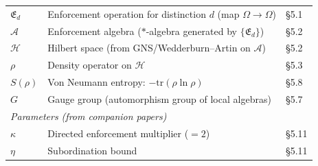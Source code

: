 \documentclass[11pt]{article}
\begin{document}
\begin{center}
\begin{tabular}{lp{8.5cm}l}
$\mathfrak{E}_d$ & Enforcement operation for distinction $d$ (map $\Omega \to \Omega$) & \S5.1 \\
$\mathcal{A}$ & Enforcement algebra ($*$-algebra generated by $\{\mathfrak{E}_d\}$) & \S5.2 \\
$\mathcal{H}$ & Hilbert space (from GNS/Wedderburn--Artin on $\mathcal{A}$) & \S5.2 \\
$\rho$ & Density operator on $\mathcal{H}$ & \S5.3 \\
$S(\rho)$ & Von Neumann entropy: $-\mathrm{tr}(\rho \ln \rho)$ & \S5.8 \\
$G$ & Gauge group (automorphism group of local algebras) & \S5.7 \\[4pt]
\multicolumn{3}{l}{\textit{Parameters (from companion papers)}} \\[2pt]
$\kappa$ & Directed enforcement multiplier ($= 2$) & \S5.11 \\
$\eta$ & Subordination bound & \S5.11 \\
\bottomrule
\end{tabular}
\end{center}
\end{document}
